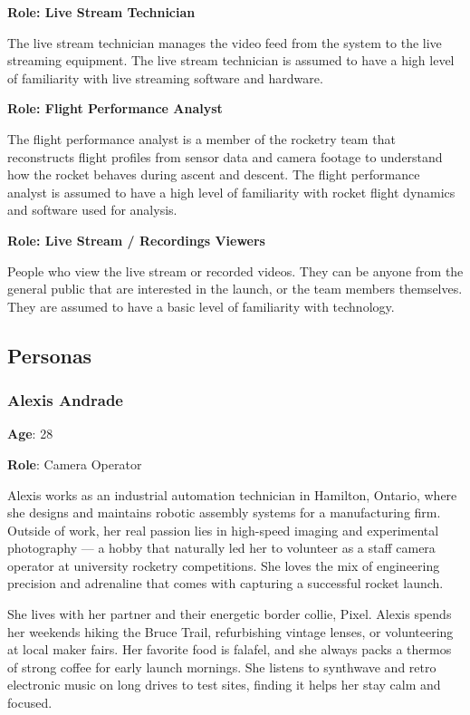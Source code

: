 \documentclass[12pt]{article}
\begin{document}
\textbf{Role: Live Stream Technician}

The live stream technician manages the video feed from the system to the live
streaming equipment. The live stream technician is assumed to have a high level
of familiarity with live streaming software and hardware.

\textbf{Role: Flight Performance Analyst}

The flight performance analyst is a member of the rocketry team that
reconstructs flight profiles from sensor data and camera footage to understand
how the rocket behaves during ascent and descent. The flight performance
analyst is assumed to have a high level of familiarity with rocket flight
dynamics and software used for analysis.

\textbf{Role: Live Stream / Recordings Viewers}

People who view the live stream or recorded videos. They can be anyone from the
general public that are interested in the launch, or the team members
themselves. They are assumed to have a basic level of familiarity with
technology.

\subsection{Personas}

\subsubsection*{Alexis Andrade}

\textbf{Age}: 28

\textbf{Role}: Camera Operator

Alexis works as an industrial automation technician in Hamilton, Ontario, where
she designs and maintains robotic assembly systems for a manufacturing firm.
Outside of work, her real passion lies in high-speed imaging and experimental
photography — a hobby that naturally led her to volunteer as a staff camera
operator at university rocketry competitions. She loves the mix of engineering
precision and adrenaline that comes with capturing a successful rocket launch.

She lives with her partner and their energetic border collie, Pixel. Alexis
spends her weekends hiking the Bruce Trail, refurbishing vintage lenses, or
volunteering at local maker fairs. Her favorite food is falafel, and she always
packs a thermos of strong coffee for early launch mornings. She listens to
synthwave and retro electronic music on long drives to test sites, finding it
helps her stay calm and focused.
\end{document}
